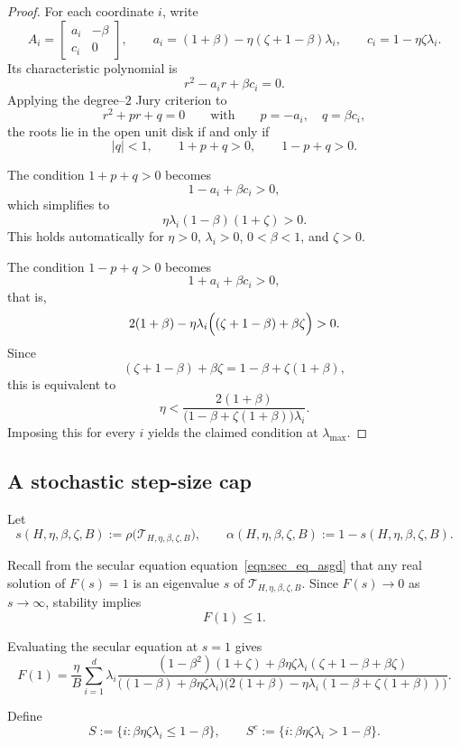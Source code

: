 \documentclass{article}
\def\eqref#1{equation~\ref{#1}}
\begin{document}
\begin{proof}
For each coordinate \(i\), write
\[
A_i=
\begin{bmatrix}
a_i & -\beta\\
c_i & 0
\end{bmatrix},
\qquad
a_i=(1+\beta)-\eta(\zeta+1-\beta)\lambda_i,
\qquad
c_i=1-\eta\zeta\lambda_i.
\]
Its characteristic polynomial is
\[
r^2-a_i r+\beta c_i=0.
\]
Applying the degree--\(2\) Jury criterion to
\[
r^2+pr+q=0
\qquad\text{with}\qquad
p=-a_i,\quad q=\beta c_i,
\]
the roots lie in the open unit disk if and only if
\[
|q|<1,\qquad 1+p+q>0,\qquad 1-p+q>0.
\]

The condition \(1+p+q>0\) becomes
\[
1-a_i+\beta c_i>0,
\]
which simplifies to
\[
\eta\lambda_i(1-\beta)(1+\zeta)>0.
\]
This holds automatically for \(\eta>0\), \(\lambda_i>0\), \(0<\beta<1\), and
\(\zeta>0\).

The condition \(1-p+q>0\) becomes
\[
1+a_i+\beta c_i>0,
\]
that is,
\[
2(1+\beta)-\eta\lambda_i\Bigl((\zeta+1-\beta)+\beta\zeta\Bigr)>0.
\]
Since
\[
(\zeta+1-\beta)+\beta\zeta
=
1-\beta+\zeta(1+\beta),
\]
this is equivalent to
\[
\eta<
\frac{2(1+\beta)}
{\bigl(1-\beta+\zeta(1+\beta)\bigr)\lambda_i}.
\]
Imposing this for every \(i\) yields the claimed condition at
\(\lambda_{\max}\).
\end{proof}

\subsection{A stochastic step-size cap}

Let
\[
s(H,\eta,\beta,\zeta,B)
:=
\rho\big(\mathcal{T}_{H,\eta,\beta,\zeta,B}\big),
\qquad
\alpha(H,\eta,\beta,\zeta,B)
:=
1-s(H,\eta,\beta,\zeta,B).
\]

Recall from the secular equation \eqref{eqn:sec_eq_asgd} that any real solution
of \(F(s)=1\) is an eigenvalue \(s\) of \(\mathcal T_{H,\eta,\beta,\zeta,B}\).
Since \(F(s)\to 0\) as \(s\to\infty\), stability implies
\[
F(1)\le 1.
\]

Evaluating the secular equation at \(s=1\) gives
\begin{equation}
\label{eq:asgd-F1-exact-hbstyle}
F(1)
=
\frac{\eta}{B}
\sum_{i=1}^d
\lambda_i
\frac{
(1-\beta^2)(1+\zeta)
+
\beta\eta\zeta\lambda_i(\zeta+1-\beta+\beta\zeta)
}{
\bigl((1-\beta)+\beta\eta\zeta\lambda_i\bigr)
\bigl(2(1+\beta)-\eta\lambda_i(1-\beta+\zeta(1+\beta))\bigr)
}.
\end{equation}

Define
\begin{equation}
S:=\{i:\beta\eta\zeta\lambda_i\le 1-\beta\},
\qquad
S^c:=\{i:\beta\eta\zeta\lambda_i>1-\beta\}.
\label{eq:define_split}
\end{equation}
\end{document}

